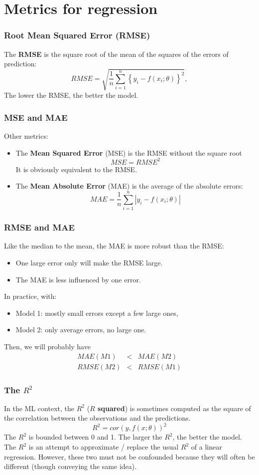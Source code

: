 \section{Metrics for regression}
\begin{frame}
\frametitle{Root Mean Squared Error (RMSE)}
The {\bf RMSE} is the square root of the mean of the squares of the errors of prediction:
$$
RMSE = \sqrt{\frac{1}{n} \sum_{i=1}^n \left\{y_i - f(x_i;\theta)\right\}^2},
$$
The lower the RMSE, the better the model.
\end{frame}
\begin{frame}
\frametitle{MSE and MAE}
Other metrics:
\begin{itemize}
\item The {\bf Mean Squared Error} (MSE) is the RMSE without the square root
$$
MSE = RMSE^2
$$
It is obviously equivalent to the RMSE.
\item The {\bf Mean Absolute Error} (MAE) is the average of the absolute errors:
$$
MAE = \frac{1}{n}\sum_{i=1}^n|y_i -f(x_i;\theta)|
$$
\end{itemize}
\end{frame}
\begin{frame}
\frametitle{RMSE and MAE}
Like the median to the mean, the MAE is more robust than the RMSE:
\begin{itemize}
\item One large error only will make the RMSE large.
\item The MAE is less influenced by one error.
\end{itemize}
In practice, with:
\begin{itemize}
\item Model 1: mostly small errors except a few large ones,
\item Model 2: only average errors, no large one.
\end{itemize}
Then, we will probably have
\begin{eqnarray*}
MAE(M1) &<& MAE(M2)\\
RMSE(M2) &<& RMSE(M1)
\end{eqnarray*}
\end{frame}
\begin{frame}[fragile]
\frametitle{The $R^2$}
In the ML context, the $R^2$ ({\bf $R$ squared}) is sometimes computed as the square of the correlation between the observations and the predictions.
$$
R^2 = cor(y,f(x;\theta))^2
$$
The $R^2$ is bounded between 0 and 1. The larger the $R^2$, the better the model.\\
\vspace{0.3cm}
The $R^2$ is an attempt to approximate / replace the usual $R^2$ of a linear regression. However, these two must not be confounded because they will often be different (though conveying the same idea).
\end{frame}
